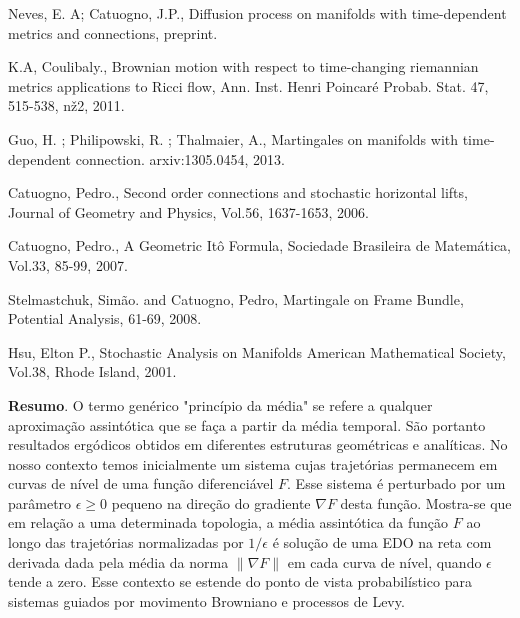 	\nocite{ref10}\nocite{ref11}\nocite{ref12}\nocite{ref13}\nocite{ref14}\nocite{ref15}\nocite{ref16}
		
	
		\begin{thebibliography}{999}
	
		 Neves, E. A; Catuogno, J.P., Diffusion process on manifolds with time-dependent metrics and connections, preprint.
		
		 K.A, Coulibaly., Brownian motion with respect to time-changing riemannian metrics applications to Ricci flow, Ann. Inst. Henri Poincaré Probab. Stat. 47, 515-538, nž2, 2011.
		
		 Guo, H. ; Philipowski, R. ; Thalmaier, A., Martingales on manifolds with time-dependent connection. arxiv:1305.0454, 2013.
		
		 Catuogno, Pedro., Second order connections and stochastic horizontal lifts, Journal of Geometry and Physics, Vol.56, 1637-1653, 2006.
		
		 Catuogno, Pedro., A Geometric Itô Formula, Sociedade Brasileira de Matemática, Vol.33, 85-99, 2007.
		
		 Stelmastchuk, Simão. and Catuogno, Pedro, Martingale on Frame Bundle, Potential Analysis, 61-69, 2008.
		
		 Hsu, Elton P., Stochastic Analysis on Manifolds American Mathematical Society, Vol.38, Rhode Island, 2001.
		
	\end{thebibliography}
	
	\vspace{24pt}


	
	
	\noindent\textbf{Resumo}.\label{pr} 
	O termo genérico "princípio da média" se refere a qualquer aproximação assintótica que se faça a partir da média temporal. São portanto resultados ergódicos obtidos em diferentes estruturas geométricas e analíticas. No nosso contexto temos inicialmente um sistema cujas trajetórias permanecem em curvas de nível de uma função diferenciável $F$. Esse sistema é perturbado por um parâmetro $\epsilon \geq 0$ pequeno na direção do gradiente $\nabla F$ desta função. Mostra-se que em relação a uma determinada topologia, a média assintótica da função $F$ ao longo das trajetórias normalizadas por $1/\epsilon$ é solução de uma EDO na reta com derivada dada pela média da norma $\| \nabla F \| $ em cada curva de nível, quando $\epsilon$ tende a zero. Esse contexto se estende do ponto de vista probabilístico para sistemas guiados por movimento Browniano e  processos de Levy.

	
	\vspace{24pt}



\clearpage	
